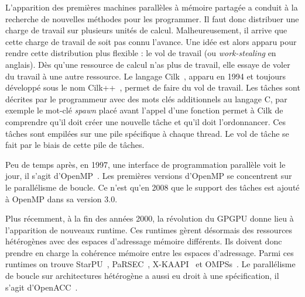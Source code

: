 L'apparition des premières machines parallèles à mémoire partagée a conduit à la recherche de nouvelles méthodes pour les programmer.
%
Il faut donc distribuer une charge de travail sur plusieurs unités de calcul.
%
Malheureusement, il arrive que cette charge de travail de soit pas connu l'avance.
%
Une idée est alors apparu pour rendre cette distribution plus flexible : le vol de travail (ou {\em work-stealing} en anglais).
%
Dès qu'une ressource de calcul n'as plus de travail, elle essaye de voler du travail à une autre ressource.
%
Le langage Cilk~\cite{Cilk}, apparu en 1994 et toujours développé sous le nom Cilk++~\cite{Cilk++}, permet de faire du vol de travail.
%
Les tâches sont décrites par le programmeur avec des mots clés additionnels au langage C, par exemple le mot-clé {\em spawn} placé avant l'appel d'une fonction permet à Cilk de comprendre qu'il doit créer une nouvelle tâche et qu'il doit l'ordonnancer.
%
Ces tâches sont empilées sur une pile spécifique à chaque thread.
%
Le vol de tâche se fait par le biais de cette pile de tâches.


Peu de temps après, en 1997, une interface de programmation parallèle voit le jour, il s'agit d'OpenMP~\cite{OpenMP}.
%
Les premières versions d'OpenMP se concentrent sur le parallélisme de boucle.
%
Ce n'est qu'en 2008 que le support des tâches est ajouté à OpenMP dans sa version 3.0.


Plus récemment, à la fin des années 2000, la révolution du GPGPU donne lieu à l'apparition de nouveaux runtime.
%
Ces runtimes gèrent désormais des ressources hétérogènes avec des espaces d'adressage mémoire différents.
%
Ils doivent donc prendre en charge la cohérence mémoire entre les espaces d'adressage.
%
Parmi ces runtimes on trouve StarPU~\cite{starpu}, PaRSEC~\cite{PaRSEC}, X-KAAPI~\cite{xkaapi} et OMPSs~\cite{OMPSs}.
%
Le parallélisme de boucle sur architectures hétérogène a aussi eu droit à une spécification, il s'agit d'OpenACC~\cite{OpenACC}.
